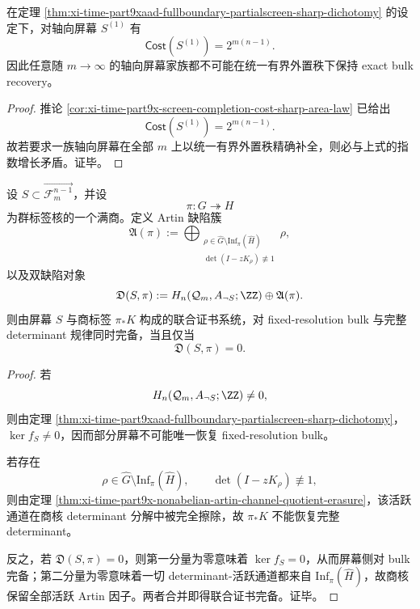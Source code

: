 \begin{corollary}[轴向屏幕的指数不可修补性]\label{cor:xi-time-part9xaad-axial-screen-exponential-irreparability}
在定理 \ref{thm:xi-time-part9xaad-fullboundary-partialscreen-sharp-dichotomy} 的设定下，对轴向屏幕 \(S^{(1)}\) 有
\[
\mathsf{Cost}(S^{(1)})=2^{m(n-1)}.
\]
因此任意随 \(m\to\infty\) 的轴向屏幕家族都不可能在统一有界外置秩下保持 exact bulk recovery。
\end{corollary}
\begin{proof}
推论 \ref{cor:xi-time-part9x-screen-completion-cost-sharp-area-law} 已给出
\[
\mathsf{Cost}(S^{(1)})=2^{m(n-1)}.
\]
故若要求一族轴向屏幕在全部 \(m\) 上以统一有界外置秩精确补全，则必与上式的指数增长矛盾。证毕。
\end{proof}

\begin{theorem}\label{thm:xi-time-part9xaad-screen-artin-double-defect-completeness}
设 \(S\subset \overrightarrow{\mathcal F_m^{n-1}}\)，并设
\[
\pi:G\twoheadrightarrow H
\]
为群标签核的一个满商。定义 Artin 缺陷簇
\[
\mathfrak A(\pi)
:=
\bigoplus_{\substack{
\rho\in\widehat G\setminus \mathrm{Inf}_\pi(\widehat H)\\
\det(I-zK_\rho)\not\equiv 1}}
\rho,
\]
以及双缺陷对象
\[
\mathfrak D(S,\pi)
:=
H_n(\mathcal Q_m,A_{\neg S};\ZZ)\oplus \mathfrak A(\pi).
\]
则由屏幕 \(S\) 与商标签 \(\pi_*K\) 构成的联合证书系统，对 fixed-resolution bulk 与完整 determinant 规律同时完备，当且仅当
\[
\mathfrak D(S,\pi)=0.
\]
\end{theorem}
\begin{proof}
若
\[
H_n(\mathcal Q_m,A_{\neg S};\ZZ)\neq 0,
\]
则由定理 \ref{thm:xi-time-part9xaad-fullboundary-partialscreen-sharp-dichotomy}，\(\ker f_S\neq 0\)，因而部分屏幕不可能唯一恢复 fixed-resolution bulk。

若存在
\[
\rho\in\widehat G\setminus \mathrm{Inf}_\pi(\widehat H),
\qquad
\det(I-zK_\rho)\not\equiv 1,
\]
则由定理 \ref{thm:xi-time-part9x-nonabelian-artin-channel-quotient-erasure}，该活跃通道在商核 determinant 分解中被完全擦除，故 \(\pi_*K\) 不能恢复完整 determinant。

反之，若 \(\mathfrak D(S,\pi)=0\)，则第一分量为零意味着 \(\ker f_S=0\)，从而屏幕侧对 bulk 完备；第二分量为零意味着一切 determinant-活跃通道都来自 \(\mathrm{Inf}_\pi(\widehat H)\)，故商核保留全部活跃 Artin 因子。两者合并即得联合证书完备。证毕。
\end{proof}

